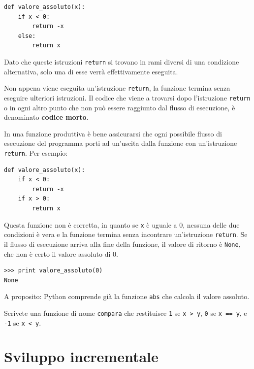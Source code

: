 \documentclass[10pt]{book}
\begin{document}
\begin{verbatim}
def valore_assoluto(x):
    if x < 0:
        return -x
    else:
        return x
\end{verbatim}
%
Dato che queste istruzioni {\tt return} si trovano in rami diversi di una
condizione alternativa, solo una di esse verrà effettivamente eseguita.

Non appena viene eseguita un'istruzione {\tt return}, la funzione termina senza eseguire ulteriori istruzioni. Il codice che viene a trovarsi dopo l'istruzione {\tt return} o in ogni altro punto che non può essere raggiunto dal flusso di esecuzione, è denominato {\bf codice morto}.

In una funzione produttiva è bene assicurarsi che ogni possibile flusso di esecuzione del programma porti ad un'uscita dalla funzione con un'istruzione
{\tt return}. Per esempio:

\begin{verbatim}
def valore_assoluto(x):
    if x < 0:
        return -x
    if x > 0:
        return x
\end{verbatim}
%
Questa funzione non è corretta, in quanto se {\tt x} è uguale a 0, nessuna delle due condizioni è vera e la funzione termina senza incontrare un'istruzione {\tt return}. Se il flusso di esecuzione arriva alla fine della funzione, il valore di ritorno è {\tt None}, che non è certo il valore assoluto di 0.

\begin{verbatim}
>>> print valore_assoluto(0)
None
\end{verbatim}
%
A proposito: Python comprende già la funzione {\tt abs} che calcola il valore assoluto.

\vspace{0.2in}
\begin{exercise}

Scrivete una funzione di nome {\tt compara} che restituisce
 {\tt 1} se {\tt x > y}, {\tt 0} se {\tt x == y}, e {\tt -1} se {\tt x < y}.
\end{exercise}


\section{Sviluppo incrementale}
\label{incremental.development}
\end{document}
